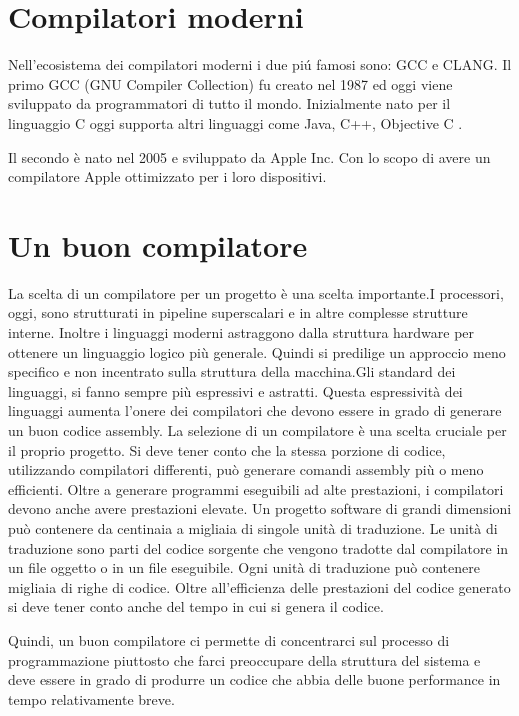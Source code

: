 \documentclass[12pt, a4paper]{report}
\begin{document}
\section{Compilatori moderni}
Nell'ecosistema dei compilatori moderni i due pi\'u famosi sono: GCC e CLANG.
Il primo GCC (GNU Compiler Collection) fu creato nel 1987 ed oggi viene sviluppato da programmatori di tutto il mondo. Inizialmente nato per il linguaggio C oggi supporta altri linguaggi come Java, C++, Objective C \cite{GCCstory}.

Il secondo è nato nel 2005 e sviluppato da Apple Inc. Con lo scopo di avere un compilatore Apple ottimizzato per i loro dispositivi\cite{ClangStory}.

\section{Un buon compilatore} %
La scelta di un compilatore per un progetto è una scelta importante.I processori, oggi, sono strutturati in pipeline superscalari e in altre complesse strutture interne. Inoltre i linguaggi moderni astraggono dalla struttura hardware per ottenere un linguaggio logico più generale. Quindi si predilige un approccio meno specifico e non incentrato sulla struttura della macchina.Gli standard dei linguaggi, si fanno sempre più espressivi e astratti. Questa espressività dei linguaggi aumenta l'onere dei compilatori che devono essere in grado di generare un buon codice assembly. La selezione di un compilatore è una scelta cruciale per il proprio progetto. Si deve tener conto che la stessa porzione di codice, utilizzando compilatori differenti, può generare comandi assembly più o meno efficienti.
Oltre a generare programmi eseguibili ad alte prestazioni, i compilatori devono anche avere prestazioni elevate. Un progetto software di grandi dimensioni può contenere da centinaia a migliaia di singole unità di traduzione. Le unità di traduzione sono parti del codice sorgente che vengono tradotte dal compilatore in un file oggetto o in un file eseguibile. Ogni unità di traduzione può contenere migliaia di righe di codice. Oltre all'efficienza delle prestazioni del codice generato si deve tener conto anche del tempo in cui si genera il codice.

Quindi, un buon compilatore ci permette di concentrarci sul processo di programmazione piuttosto che farci preoccupare della struttura del sistema e deve essere in grado di produrre un codice che abbia delle buone performance in tempo relativamente breve.
\end{document}
